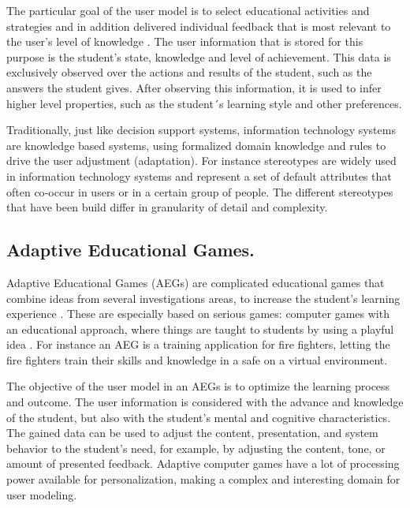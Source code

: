 The particular goal of the user model is to select educational activities and
strategies and in addition  delivered individual feedback that is most relevant
to the user’s level of knowledge \cite{kobsa2001generic} \cite{mctear1993user}. The user
information that is stored for this purpose is the student’s state, knowledge
and level of  achievement. This data is exclusively observed over the actions
and results of the student, such as the answers the student gives. After
observing this information, it is used to infer higher level  properties, such
as the student´s learning style and other preferences.

Traditionally, just like decision support systems, information technology
systems are knowledge based systems, using formalized domain  knowledge and
rules to drive the user adjustment (adaptation). For instance stereotypes are
widely used in information technology systems \cite{kay2012coming} and represent a set of
default attributes that often co‐occur in users or in a certain group of people.
The different stereotypes that have been build differ in granularity of detail
and complexity.


\subsection{Adaptive Educational Games.} 

Adaptive Educational Games (AEGs) are complicated educational games that combine
ideas from several investigations areas, to increase the student’s learning
experience \cite{peeters2012situated}. These are especially based on  serious
games: computer games with an educational approach, where things are taught to
students by using a  playful idea \cite{korteling2011transfer} \cite{johnson2005serious}. For instance an AEG is a training application  for fire fighters, letting
the fire fighters train their skills and knowledge in a safe on a virtual
environment.
  
The objective of the user model in an AEGs is to optimize the learning process
and outcome.   The user information is considered with the advance and knowledge
of the student, but also with the  student’s mental and cognitive
characteristics. The gained data can be used to adjust the content,
presentation, and system behavior to the  student’s need, for example, by
adjusting the content, tone, or amount of presented feedback. Adaptive computer
games have a lot of processing power available for personalization,  making a
complex and interesting domain for user modeling.

